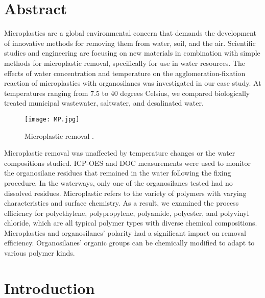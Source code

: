\documentclass[12pt]{article}
\begin{document}
\section{Abstract}
Microplastics are a global environmental concern that demands the development of innovative methods for removing them from water, soil, and the air. Scientific studies and engineering are focusing on new materials in combination with simple methods for microplastic removal, specifically for use in water resources. The effects of water concentration and temperature on the agglomeration-fixation reaction of microplastics with organosilanes was investigated in our case study. At temperatures ranging from 7.5 to 40 degrees Celsius, we compared biologically treated municipal wastewater, saltwater, and desalinated water.
\begin{figure}[h]
\centering
\texttt{[image: MP.jpg]}
\caption{Microplastic removal .}
\label{fig_ROB}
\end{figure}
 Microplastic removal was unaffected by temperature changes or the water compositions studied. ICP-OES and DOC measurements were used to monitor the organosilane residues that remained in the water following the fixing procedure.
In the waterways, only one of the organosilanes tested had no dissolved residues. Microplastic refers to the variety of polymers with varying characteristics and surface chemistry. As a result, we examined the process efficiency for polyethylene, polypropylene, polyamide, polyester, and polyvinyl chloride, which are all typical polymer types with diverse chemical compositions. Microplastics and organosilanes' polarity had a significant impact on removal efficiency. Organosilanes' organic groups can be chemically modified to adapt to various polymer kinds.

\clearpage

\section{Introduction}
\end{document}

